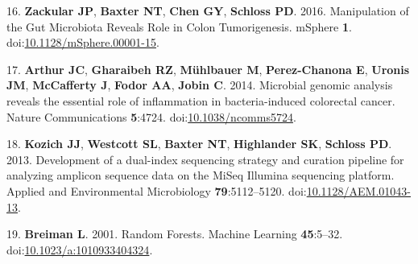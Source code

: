 \documentclass[12pt,]{article}
\begin{document}
\hypertarget{ref-zackular_manipulation_2016}{}
16. \textbf{Zackular JP}, \textbf{Baxter NT}, \textbf{Chen GY},
\textbf{Schloss PD}. 2016. Manipulation of the Gut Microbiota Reveals
Role in Colon Tumorigenesis. mSphere \textbf{1}.
doi:\href{https://doi.org/10.1128/mSphere.00001-15}{10.1128/mSphere.00001-15}.

\hypertarget{ref-arthur_microbial_2014}{}
17. \textbf{Arthur JC}, \textbf{Gharaibeh RZ}, \textbf{Mühlbauer M},
\textbf{Perez-Chanona E}, \textbf{Uronis JM}, \textbf{McCafferty J},
\textbf{Fodor AA}, \textbf{Jobin C}. 2014. Microbial genomic analysis
reveals the essential role of inflammation in bacteria-induced
colorectal cancer. Nature Communications \textbf{5}:4724.
doi:\href{https://doi.org/10.1038/ncomms5724}{10.1038/ncomms5724}.

\hypertarget{ref-kozich_development_2013}{}
18. \textbf{Kozich JJ}, \textbf{Westcott SL}, \textbf{Baxter NT},
\textbf{Highlander SK}, \textbf{Schloss PD}. 2013. Development of a
dual-index sequencing strategy and curation pipeline for analyzing
amplicon sequence data on the MiSeq Illumina sequencing platform.
Applied and Environmental Microbiology \textbf{79}:5112--5120.
doi:\href{https://doi.org/10.1128/AEM.01043-13}{10.1128/AEM.01043-13}.

\hypertarget{ref-breiman_random_2001}{}
19. \textbf{Breiman L}. 2001. Random Forests. Machine Learning
\textbf{45}:5--32.
doi:\href{https://doi.org/10.1023/a:1010933404324}{10.1023/a:1010933404324}.
\end{document}
